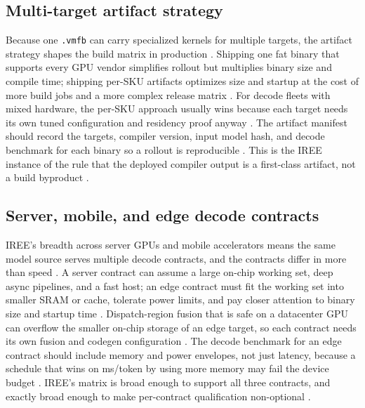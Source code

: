 \subsection{Multi-target artifact strategy}

Because one \texttt{.vmfb} can carry specialized kernels for multiple targets, the artifact strategy shapes the build matrix in production \citep{iree2024}. Shipping one fat binary that supports every GPU vendor simplifies rollout but multiplies binary size and compile time; shipping per-SKU artifacts optimizes size and startup at the cost of more build jobs and a more complex release matrix \citep{patel2025llminference,memoryfloor2026}. For decode fleets with mixed hardware, the per-SKU approach usually wins because each target needs its own tuned configuration and residency proof anyway \citep{nvidia2022hopper,amd2024aie}. The artifact manifest should record the targets, compiler version, input model hash, and decode benchmark for each binary so a rollout is reproducible \citep{chen2020compilerbasedhardw,taxbreak2026}. This is the IREE instance of the rule that the deployed compiler output is a first-class artifact, not a build byproduct \citep{patel2025llminference,memoryfloor2026}.

\subsection{Server, mobile, and edge decode contracts}

IREE's breadth across server GPUs and mobile accelerators means the same model source serves multiple decode contracts, and the contracts differ in more than speed \citep{iree2024,memoryfloor2026}. A server contract can assume a large on-chip working set, deep async pipelines, and a fast host; an edge contract must fit the working set into smaller SRAM or cache, tolerate power limits, and pay closer attention to binary size and startup time \citep{iree2024,dlbook}. Dispatch-region fusion that is safe on a datacenter GPU can overflow the smaller on-chip storage of an edge target, so each contract needs its own fusion and codegen configuration \citep{amd2024xdna,memoryfloor2026}. The decode benchmark for an edge contract should include memory and power envelopes, not just latency, because a schedule that wins on ms/token by using more memory may fail the device budget \citep{patel2025llminference,taxbreak2026}. IREE's matrix is broad enough to support all three contracts, and exactly broad enough to make per-contract qualification non-optional \citep{iree2024,chen2020compilerbasedhardw}.

